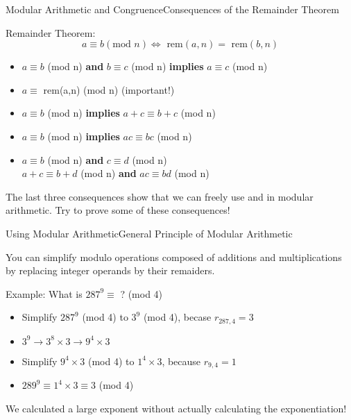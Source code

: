\begin{frame}{Modular Arithmetic and Congruence}{Consequences of the Remainder Theorem}

  Remainder Theorem:
  \begin{equation*}
    a \equiv b (\text{mod } n) \iff \text{ rem}(a,n) = \text{ rem}(b,n)
  \end{equation*}

  \begin{itemize}
  \item $a \equiv b$ (mod n) {\bf and} $b \equiv c$ (mod n) {\bf implies}
    $a \equiv c$ (mod n)
  \item $a \equiv $ rem(a,n) (mod n) \hspace{1cm} (\alert{important!})\bigskip
  \item $a \equiv b$ (mod n) {\bf implies} $a+c \equiv b+c$ (mod n)
  \item $a \equiv b$ (mod n) {\bf implies} $ac \equiv bc$ (mod n)
  \item $a \equiv b$ (mod n) {\bf and} $c\equiv d$ (mod n)\\
    \hspace{2cm}{\bf implies} $a+c \equiv b+d$ (mod n) {\bf and} $ac \equiv bd$ (mod n)
  \end{itemize}\bigskip

  The last three consequences show that we can freely use  and  in modular arithmetic. Try to prove some of these consequences!
\end{frame}

\begin{frame}{Using Modular Arithmetic}{General Principle of Modular Arithmetic}

  \begin{block}{}
    You can simplify modulo operations composed of additions and multiplications by replacing integer operands by their remaiders.
  \end{block}

  Example: What is $287^9 \equiv$ ? (mod 4)

  \begin{itemize}
    \item Simplify $287^9$ (mod 4) to $3^9$ (mod 4), becase $r_{287,4} = 3$
    \item $3^9 \to 3^8\times 3 \to 9^4 \times 3$
    \item Simplify $9^4 \times 3$ (mod 4) to $1^4 \times 3$, because $r_{9,4} = 1$
    \item $289^9 \equiv 1^4 \times 3 \equiv 3$ (mod 4)
  \end{itemize}\bigskip

  We calculated a large exponent without actually calculating the exponentiation!
\end{frame}

